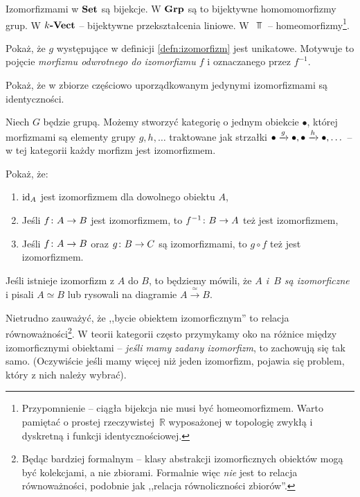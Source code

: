 \begin{exmp}
  Izomorfizmami w $\textbf{Set}$ są bijekcje. W $\textbf{Grp}$ są to bijektywne homomomorfizmy grup. W $k\textbf{-Vect}$ -- bijektywne przekształcenia liniowe. W~$\Top$ -- homeomorfizmy\footnote{Przypomnienie -- ciągła bijekcja nie musi być homeomorfizmem. Warto pamiętać o prostej rzeczywistej~$\mathbb R$ wyposażonej w topologię zwykłą i dyskretną i funkcji identycznościowej.}.
\end{exmp}

\begin{exc}
  Pokaż, że $g$ występujące w definicji \ref{defn:izomorfizm} jest unikatowe. Motywuje to pojęcie \emph{morfizmu odwrotnego do izomorfizmu $f$} i oznaczanego przez $f^{-1}$.
\end{exc}

\begin{exc}
  Pokaż, że w zbiorze częściowo uporządkowanym jedynymi izomorfizmami są identyczności.
\end{exc}

\begin{exmp}
  Niech $G$ będzie grupą. Możemy stworzyć kategorię o jednym obiekcie $\bullet$, której morfizmami są elementy grupy $g, h,\dots$ traktowane jak strzałki $\bullet \xrightarrow{g} \bullet, \bullet \xrightarrow{h} \bullet, \dots$ -- w tej kategorii każdy morfizm jest izomorfizmem.
\end{exmp}

\begin{exc}
  Pokaż, że:
  \begin{enumerate}
    \item $\mathrm{id}_{A}$ jest izomorfizmem dla dowolnego obiektu $A$,
    \item Jeśli $f\colon A\to B$ jest izomorfizmem, to $f^{-1}\colon B\to A$ też jest izomorfizmem,
    \item Jeśli $f\colon A\to B$ oraz $g\colon B\to C$ są izomorfizmami, to $g\circ f$ też jest izomorfizmem.
  \end{enumerate}
\end{exc}

\begin{defn}
  Jeśli istnieje izomorfizm z $A$ do $B$, to będziemy mówili, że \emph{$A$ i~$B$ są izomorficzne} i pisali $A\simeq B$ lub rysowali na diagramie $A\xrightarrow{~\simeq~} B$.
\end{defn}

\begin{remk}
  Nietrudno zauważyć, że ,,bycie obiektem izomorficznym'' to relacja równoważności\footnote{Będąc bardziej formalnym -- klasy abstrakcji izomorficznych obiektów mogą być kolekcjami, a nie zbiorami. Formalnie więc \emph{nie} jest to relacja równoważności, podobnie jak ,,relacja równoliczności zbiorów''.}. W teorii kategorii często przymykamy oko na różnice między izomorficznymi obiektami -- \emph{jeśli mamy zadany izomorfizm}, to zachowują się tak samo. (Oczywiście jeśli mamy więcej niż jeden izomorfizm, pojawia się problem, który z nich należy wybrać).
\end{remk}

